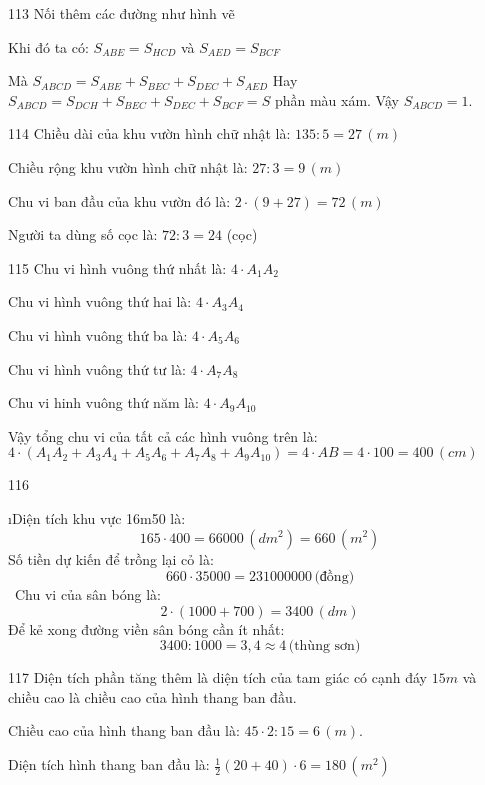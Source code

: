 \begin{Answer}{113}
		Nối thêm các đường như hình vẽ
		
		Khi đó ta có:  ${{S}_{ABE}}={{S}_{HCD}}$  và  ${{S}_{AED}}={{S}_{BCF}}$
		
		Mà  ${{S}_{ABCD}}={{S}_{ABE}}+{{S}_{BEC}}+{{S}_{DEC}}+{{S}_{AED}}$
		Hay  ${{S}_{ABCD}}={{S}_{DCH}}+{{S}_{BEC}}+{{S}_{DEC}}+{{S}_{BCF}}=S$ phần màu xám.
		Vậy  ${{S}_{ABCD}}=1$.
	
\end{Answer}
\begin{Answer}{114}
		Chiều dài của khu vườn hình chữ nhật là:  $135:5=27\,(m)$
		
		Chiều rộng khu vườn hình chữ nhật là:  $27:3=9 \,(m)$
		
		Chu vi ban đầu của khu vườn đó là:  $2\cdot(9+27)=72\,(m)$
		
		Người ta dùng số cọc là:  $72:3=24$ (cọc)
	
\end{Answer}
\begin{Answer}{115}
		Chu vi hình vuông thứ nhất là:  $4\cdot{{A}_{1}}{{A}_{2}}$
		
		Chu vi hình vuông thứ hai là:  $4\cdot{{A}_{3}}{{A}_{4}}$
		
		Chu vi hình vuông thứ ba là:  $4\cdot{{A}_{5}}{{A}_{6}}$
		
		Chu vi hình vuông thứ tư là:  $4\cdot{{A}_{7}}{{A}_{8}}$
		
		Chu vi hinh vuông thứ năm là:  $4\cdot{{A}_{9}}{{A}_{10}}$
		
		Vậy tổng chu vi của tất cả các hình vuông trên là:
		$4\cdot({{A}_{1}}{{A}_{2}}+{{A}_{3}}{{A}_{4}}+{{A}_{5}}{{A}_{6}}+{{A}_{7}}{{A}_{8}}+{{A}_{9}}{{A}_{10}})=4\cdot AB=4\cdot 100=400 \,(cm)$
	
\end{Answer}
\begin{Answer}{116}
		\begin{enumerate}[a), leftmargin=*]
			\i Diện tích khu vực 16m50 là:
			\[165\cdot400=66000 \,(dm^2)=660 \,(m^2)\]
			Số tiền dự kiến để trồng lại cỏ là:
			\[660\cdot35000=231000000 \,\text{(đồng)}\]
			\ Chu vi của sân bóng là:
			\[2\cdot(1000+700)=3400 \,(dm)\]
			Để kẻ xong đường viền sân bóng cần ít nhất:
			\[3400:1000=3,4\approx 4\,  \text{(thùng sơn)}\]
		\end{enumerate}
	
\end{Answer}
\begin{Answer}{117}
		Diện tích phần tăng thêm là diện tích của tam giác có cạnh đáy  $15m$ và chiều cao là chiều cao của hình thang ban đầu.
		
		Chiều cao của hình thang ban đầu là:  $45\cdot2:15=6 \,(m).$
		
		Diện tích hình thang ban đầu là:  $\frac{1}{2}(20+40)\cdot6=180\, (m^2)$
	
\end{Answer}
